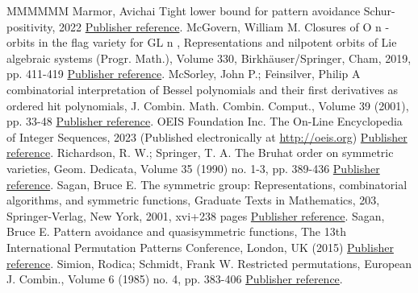 \begin{thebibliography}{MMMMMM}
 Marmor, Avichai Tight lower bound for pattern avoidance Schur-positivity, 2022 \href{https://alco.centre-mersenne.org/articles/10.5802/alco.351/#my_pattern_theorem}{Publisher reference}.
 McGovern, William M. Closures of O n -orbits in the flag variety for GL n , Representations and nilpotent orbits of Lie algebraic systems (Progr. Math.), Volume 330, Birkhäuser/Springer, Cham, 2019, pp. 411-419 \href{https://alco.centre-mersenne.org/articles/10.5802/alco.351/#mcgovern2019closures}{Publisher reference}.
 McSorley, John P.; Feinsilver, Philip A combinatorial interpretation of Bessel polynomials and their first derivatives as ordered hit polynomials, J. Combin. Math. Combin. Comput., Volume 39 (2001), pp. 33-48 \href{https://alco.centre-mersenne.org/articles/10.5802/alco.351/#bessel_polynomials_mathcings}{Publisher reference}.
 OEIS Foundation Inc. The On-Line Encyclopedia of Integer Sequences, 2023 (Published electronically at \url{http://oeis.org}) \href{https://alco.centre-mersenne.org/articles/10.5802/alco.351/#oeis}{Publisher reference}.
 Richardson, R. W.; Springer, T. A. The Bruhat order on symmetric varieties, Geom. Dedicata, Volume 35 (1990) no. 1-3, pp. 389-436 \href{https://alco.centre-mersenne.org/articles/10.5802/alco.351/#richardson1990bruhat}{Publisher reference}.
 Sagan, Bruce E. The symmetric group: Representations, combinatorial algorithms, and symmetric functions, Graduate Texts in Mathematics, 203, Springer-Verlag, New York, 2001, xvi+238 pages \href{https://alco.centre-mersenne.org/articles/10.5802/alco.351/#sagan_book}{Publisher reference}.
 Sagan, Bruce E. Pattern avoidance and quasisymmetric functions, The 13th International Permutation Patterns Conference, London, UK (2015) \href{https://alco.centre-mersenne.org/articles/10.5802/alco.351/#problem_find_pattern}{Publisher reference}.
 Simion, Rodica; Schmidt, Frank W. Restricted permutations, European J. Combin., Volume 6 (1985) no. 4, pp. 383-406 \href{https://alco.centre-mersenne.org/articles/10.5802/alco.351/#simion1985restricted}{Publisher reference}.
\end{thebibliography}
